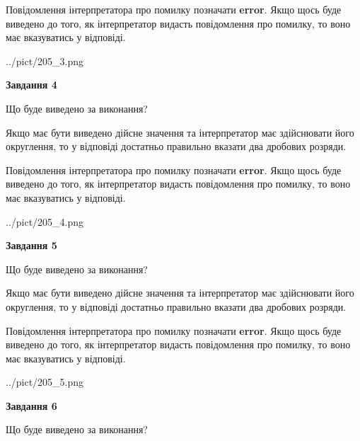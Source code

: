 \documentclass[12pt, ukrainian]{article}
\begin{document}
{\begin {Large}
Повідомлення інтерпретатора про помилку позначати \textbf{error}.
Якщо щось буде виведено до того, як інтерпретатор видасть повідомлення про помилку, 
то воно має вказуватись у відповіді. \par

\begin{center}
	{../pict/205_3.png}
\end{center}
\newpage

{\begin {center}\textbf{Завдання 4}\end {center}}\par
Що буде виведено за виконання? \par

Якщо має бути виведено дійсне значення та інтерпретатор має здійснювати його округлення, 
то у відповіді достатньо правильно вказати два дробових розряди.

Повідомлення інтерпретатора про помилку позначати \textbf{error}.
Якщо щось буде виведено до того, як інтерпретатор видасть повідомлення про помилку, 
то воно має вказуватись у відповіді. \par

\begin{center}
	{../pict/205_4.png}
\end{center}
\newpage

{\begin {center}\textbf{Завдання 5}\end {center}}\par
Що буде виведено за виконання? \par

Якщо має бути виведено дійсне значення та інтерпретатор має здійснювати його округлення, 
то у відповіді достатньо правильно вказати два дробових розряди.

Повідомлення інтерпретатора про помилку позначати \textbf{error}.
Якщо щось буде виведено до того, як інтерпретатор видасть повідомлення про помилку, 
то воно має вказуватись у відповіді. \par

\begin{center}
	{../pict/205_5.png}
\end{center}
\newpage

{\begin {center}\textbf{Завдання 6}\end {center}}\par
Що буде виведено за виконання? \par


\end{Large}}
\end{document}
